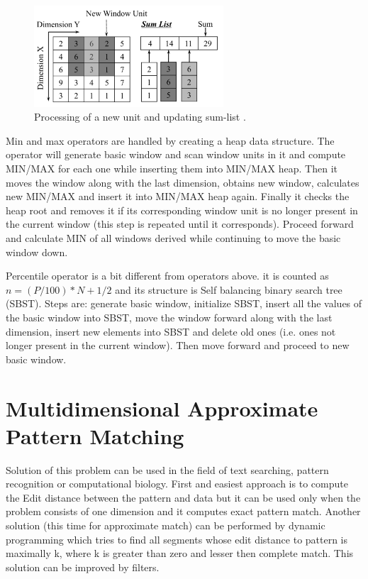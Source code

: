 \begin{figure}
\centering
\includegraphics[width=0.63\textwidth]{windowAM_sum2.PNG}
\caption{Processing of a new unit and updating sum-list \cite{windowAggr}.}
\label{windowAM2}
\end{figure}

Min and max operators are handled by creating a heap data structure. The operator will generate basic window and scan window units in it and compute MIN/MAX for each one while inserting them into MIN/MAX heap. Then it moves the window along with the last dimension, obtains new window, calculates new MIN/MAX and insert it into MIN/MAX heap again. Finally it checks the heap root and removes it if its corresponding window unit is no longer present in the current window (this step is repeated until it corresponds). Proceed forward and calculate MIN of all windows derived while continuing to move the basic window down.

Percentile operator is a bit different from operators above. it is counted as $n=(P/100)*N+1/2$ and its structure is Self balancing binary search tree (SBST). Steps are: generate basic window, initialize SBST, insert all the values of the basic window into SBST, move the window forward along with the last dimension, insert new elements into SBST and delete old ones (i.e. ones not longer present in the current window). Then move forward and proceed to new basic window. \cite{windowAggr}


\section{Multidimensional Approximate Pattern Matching}
Solution of this problem can be used in the field of text searching, pattern recognition or computational biology.
First and easiest approach is to compute the Edit distance between the pattern and data but it can be used only when the problem consists of one dimension and it computes exact pattern match. Another solution (this time for approximate match) can be performed by dynamic programming which tries to find all segments whose edit distance to pattern is maximally k, where k is greater than zero and lesser then complete match. This solution can be improved by filters.

